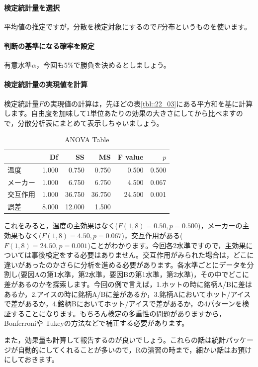 \documentclass{ltjsarticle}
\begin{document}
\paragraph{検定統計量を選択}平均値の推定ですが，分散を検定対象にするので$F$分布というものを使います。
\paragraph{判断の基準になる確率を設定}有意水準$\alpha$，今回も5\%で勝負を決めるとしましょう。
\paragraph{検定統計量の実現値を計算}検定統計量$F$の実現値の計算は，先ほどの表\ref{tbl::22_03}にある平方和を基に計算します。自由度を加味して1単位あたりの効果の大きさにしてから比べますので，分散分析表にまとめて表示しちゃいましょう。
\begin{table}[ht]
	\centering
	\caption{ANOVA Table}
	\begin{tabular}{lrrrrr}
		\hline
		     & Df    & SS     & MS     & F value & $p$   \\
		\hline
		温度   & 1.000 & 0.750  & 0.750  & 0.500   & 0.500 \\
		メーカー & 1.000 & 6.750  & 6.750  & 4.500   & 0.067 \\
		交互作用 & 1.000 & 36.750 & 36.750 & 24.500  & 0.001 \\
		誤差   & 8.000 & 12.000 & 1.500  &         &       \\
		\hline
	\end{tabular}
	\label{tbl::22_04}
\end{table}
これをみると，温度の主効果はなく($F(1,8)=0.50,p=0.500$)，メーカーの主効果もなく($F(1,8)=4.50,p=0.067$)，交互作用がある($F(1,8)=24.50,p=0.001$)ことがわかります。今回各2水準ですので，主効果については事後検定をする必要はありません。交互作用がみられた場合は，どこに違いがあったのかさらに分析を進める必要があります。各水準ごとにデータを分割し(要因Aの第1水準，第2水準，要因Bの第1水準，第2水準)，その中でどこに差があるのかを探索します。今回の例で言えば，1.ホットの時に銘柄A/Bに差はあるか，2.アイスの時に銘柄A/Bに差があるか，3.銘柄Aにおいてホット/アイスで差があるか，4.銘柄Bにおいてホット/アイスで差があるか，の4パターンを検証することになります。もちろん検定の多重性の問題がありますから，Bonferroniや Tukeyの方法などで補正する必要があります。

また，効果量も計算して報告するのが良いでしょう。これらの話は統計パッケージが自動的にしてくれることが多いので，Rの演習の時まで，細かい話はお預けにしておきます。
\end{document}
